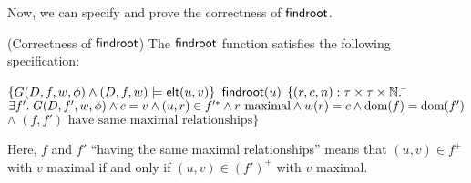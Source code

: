 Now, we can specify and prove the correctness of $\mathsf{findroot}$. 

\begin{lemma}{(Correctness of $\mathsf{findroot}$)}
The $\mathsf{findroot}$ function satisfies the following specification:
\begin{specification}
\nextline $\{G(D, f, w, \phi) \land (D,f,w) \models \mathsf{elt}({u}, {v})\}$
\nextline $\mathsf{findroot}(u)$
\nextline $\{(r,c,n):\tau \times \tau \times \mathbb{N}.$ 
\nextline\;\;\= $\exists f'.\; G(D, f', w, \phi) \land c = v \land (u,r) \in f'^{*} \land r \mbox{ maximal} \land w(r) = c \land \mbox{dom}({f}) = \mbox{dom}({f'})$
\nextline\> $\land\; (f,f')\mbox{ have same maximal relationships}\}$
\end{specification}
\end{lemma}

Here, $f$ and $f'$ ``having the same maximal relationships'' means that $(u,v) \in f^+$ with $v$ maximal
if and only if $(u, v) \in (f')^+$ with $v$ maximal. 

